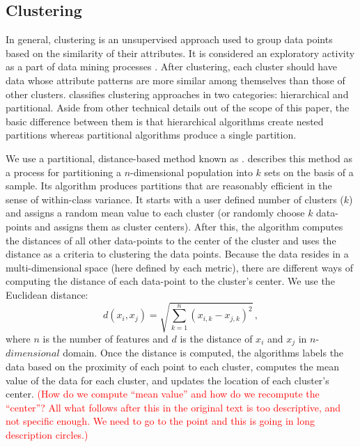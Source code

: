 \subsection{Clustering}
\label{sec:clustering}

In general, clustering is an unsupervised approach used to group data points based on the similarity of their attributes. It is considered an exploratory activity as a part of data mining processes \citep{Fayyad_1996_IEEE}. After clustering, each cluster should have data whose attribute patterns are more similar among themselves than those of other clusters. \citet{Jain_1999_ACMCS} classifies clustering approaches in two categories: hierarchical and partitional. Aside from other technical details out of the scope of this paper, the basic difference between them is that hierarchical algorithms create nested partitions whereas partitional algorithms produce a single partition. 

We use a partitional, distance-based method known as \kmeans{}. \citet{Macqueen_1967_Proc} describes this method as a process for partitioning a $n$-dimensional population into $k$ sets on the basis of a sample. Its algorithm produces partitions that are reasonably efficient in the sense of within-class variance. It starts with a user defined number of clusters ($k$) and assigns a random mean value to each cluster (or randomly choose $k$ data-points and assigns them as cluster centers). After this, the algorithm computes the distances of all other data-points to the center of the cluster and uses the distance as a criteria to clustering the data points. Because the data resides in a multi-dimensional space (here defined by each metric), there are different ways of computing the distance of each data-point to the cluster's center. We use the Euclidean distance:
% 
\begin{equation}
	d(x_i, x_j) = \sqrt{ \sum_{k=1}^{n} \left( x_{i,k} - x_{j,k} \right)^2 } 
	\, ,
\end{equation}
% 
where $n$ is the number of features and $d$ is the distance of $x_i$ and $x_j$ in $n$-$dimensional$ domain. Once the distance is computed, the algorithms labels the data based on the proximity of each point to each cluster, computes the mean value of the data for each cluster, and updates the location of each cluster's center. \textcolor{red}{(How do we compute ``mean value'' and how do we recompute the ``center''? All what follows after this in the original text is too descriptive, and not specific enough. We need to go to the point and this is going in long description circles.)} 


